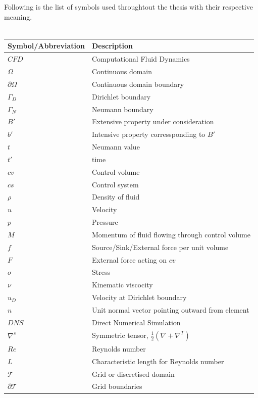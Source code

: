\documentclass[a4paper,twoside,openright]{book}
\begin{document}
Following is the list of symbols used throughtout the thesis with their respective meaning.\\
${}$\\
\begin{longtable}{| p{} | p{} |}
\hline
\textbf{Symbol/Abbreviation} & \textbf{Description}\\
\hline
$CFD$ & Computational Fluid Dynamics\\
\hline
$\Omega$ & Continuous domain\\
\hline
$\partial \Omega$ & Continuous domain boundary\\
\hline
$\Gamma_D$ & Dirichlet boundary\\
\hline
$\Gamma_N$ & Neumann boundary\\
\hline
$B'$ & Extensive property under consideration \\
\hline
$b'$ & Intensive property corressponding to $B'$\\
\hline
$t$ & Neumann value\\
\hline
$t'$ & time\\
\hline
$cv$ & Control volume\\
\hline
$cs$ & Control system\\
\hline
$\rho$ & Density of fluid \\
\hline
$u$ & Velocity\\
\hline
$p$ & Pressure\\
\hline
$M$ & Momentum of fluid flowing through control volume\\
\hline
$f$ & Source/Sink/External force per unit volume\\
\hline
$F$ & External force acting on $cv$\\
\hline
$\sigma$ & Stress\\
\hline
$\nu$ & Kinematic viscocity\\
\hline
$u_D$ & Velocity at Dirichlet boundary\\
\hline
$n$ & Unit normal vector pointing outward from element\\
\hline
$DNS$ & Direct Numerical Simulation\\
\hline
$\nabla^s$ & Symmetric tensor, $\frac{1}{2} (\nabla + \nabla^T)$\\
\hline
$Re$ & Reynolds number\\
\hline
$L$ & Characteristic length for Reynolds number\\
\hline
$\mathcal{T}$ & Grid or discretised domain\\
\hline
$\partial \mathcal{T}$ & Grid boundaries\\

\end{longtable}
\end{document}
